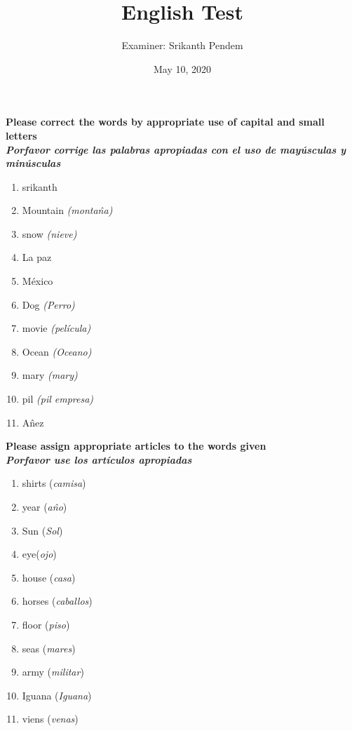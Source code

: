 \documentclass{article}
\title{English Test}
\date{May 10, 2020}
\author{Examiner: Srikanth Pendem}
\begin{document}
\newcommand\tab[1][1cm]{\hspace*{#1}}
\maketitle
\newpage
\noindent \textbf{Please correct the words by appropriate use of capital and small letters}\\
\noindent \textbf{\textit{Porfavor corrige las palabras apropiadas con el uso de mayúsculas y minúsculas}}

\begin{enumerate}
\item srikanth
\item Mountain \textit{(monta\^na)}
\item snow \textit{(nieve)}
\item La paz
\item M\'exico
\item Dog \textit{(Perro)}
\item movie \textit{(pel\'icula)}
\item Ocean \textit{(Oceano)}
\item mary \textit{(mary)}
\item pil \textit{(pil empresa)}
\item A\^nez 
\end{enumerate}


\noindent \textbf{Please assign appropriate articles to the words given}\\
\noindent \textbf{\textit{Porfavor use los artículos apropiadas}}

\begin{enumerate}
\item shirts (\textit{camisa}) 
\item year (\textit{a\^no}) 
\item Sun (\textit{Sol}) 
\item eye(\textit{ojo}) 
\item house (\textit{casa}) 
\item horses (\textit{caballos}) 
\item floor (\textit{piso}) 
\item seas (\textit{mares}) 
\item army (\textit{militar}) 
\item Iguana (\textit{Iguana}) 
\item viens (\textit{venas}) 
\end{enumerate}

\newpage
\end{document}
